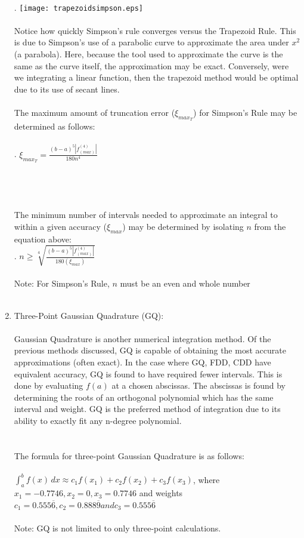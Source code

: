\documentclass{report}
\begin{document}
\begin{enumerate}
\\.\hspace{10 mm} \texttt{[image: trapezoidsimpson.eps]}
\\
\\Notice how quickly Simpson's rule converges versus the Trapezoid Rule. This is due to Simpson's use of a parabolic curve to approximate the area under $x^2$ (a parabola). Here, because the tool used to approximate the curve is the same as the curve itself, the approximation may be exact. Conversely, were we integrating a linear function, then the trapezoid method would be optimal due to its use of secant lines.
\\
\\The maximum amount of truncation error ($\xi_{max_{T}}$) for Simpson's Rule may be determined as follows:
\\
\\
. \hspace{30 mm} $\displaystyle \xi_{max_{T}} = \frac{(b-a)^{5}\left|f^{(4)}_{(max)}\right|}{180n^4}$ 
\\
\\
\\
\\
\\The minimum number of intervals needed to approximate an integral to within a given accuracy ($\xi_{max}$) may be determined by isolating $\displaystyle n$ from the equation above: 
\\
. \hspace{30 mm} $\displaystyle n \geq \sqrt[4]{\frac{(b-a)^{5}\left|f^{(4)}_{(max)}\right|}{180(\xi_{max})}} $
\\
\\Note: For Simpson's Rule, $\displaystyle n$ must be an even and whole number
\\
\\
\item Three-Point Gaussian Quadrature (GQ):
\\
\\Gaussian Quadrature is another numerical integration method. Of the previous methods discussed, GQ is capable of obtaining the most accurate approximations (often exact). In the case where GQ, FDD, CDD have equivalent accuracy, GQ is found to have required fewer intervals. This is done by evaluating $f(a)$ at a chosen abscissas. The abscissas is found by determining the roots of an orthogonal polynomial which has the same interval and weight. GQ is the preferred method of integration due to its ability to exactly fit any n-degree polynomial.
\\
\\
\\The formula for three-point Gaussian Quadrature is as follows:
\\
\\$\displaystyle \int^b_a f(x)\,dx  \approx c_1f(x_1)+c_2f(x_2)+c_3f(x_3)$, where 
\\$x_1=-0.7746, x_2=0, x_3=0.7746$ and weights $c_1=0.555\overline{6}, c_2=0.888\overline{9} and c_3=0.555\overline{6}$
\\
\\Note: GQ is not limited to only three-point calculations. 
\end{enumerate}
\end{document}
